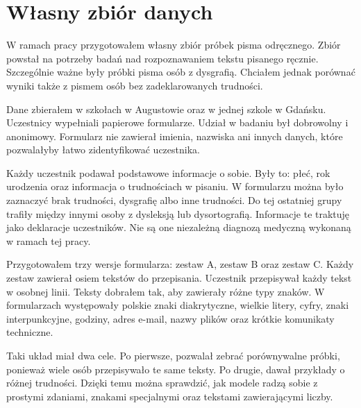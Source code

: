 \section{Własny zbiór danych}

W ramach pracy przygotowałem własny zbiór próbek pisma odręcznego. Zbiór powstał na potrzeby badań nad rozpoznawaniem tekstu pisanego ręcznie. Szczególnie ważne były próbki pisma osób z dysgrafią. Chciałem jednak porównać wyniki także z pismem osób bez zadeklarowanych trudności.

Dane zbierałem w szkołach w Augustowie oraz w jednej szkole w Gdańsku. Uczestnicy wypełniali papierowe formularze. Udział w badaniu był dobrowolny i anonimowy. Formularz nie zawierał imienia, nazwiska ani innych danych, które pozwalałyby łatwo zidentyfikować uczestnika.

Każdy uczestnik podawał podstawowe informacje o sobie. Były to: płeć, rok urodzenia oraz informacja o trudnościach w pisaniu. W formularzu można było zaznaczyć brak trudności, dysgrafię albo inne trudności. Do tej ostatniej grupy trafiły między innymi osoby z dysleksją lub dysortografią. Informacje te traktuję jako deklaracje uczestników. Nie są one niezależną diagnozą medyczną wykonaną w ramach tej pracy.

Przygotowałem trzy wersje formularza: zestaw A, zestaw B oraz zestaw C. Każdy zestaw zawierał osiem tekstów do przepisania. Uczestnik przepisywał każdy tekst w osobnej linii. Teksty dobrałem tak, aby zawierały różne typy znaków. W formularzach występowały polskie znaki diakrytyczne, wielkie litery, cyfry, znaki interpunkcyjne, godziny, adres e-mail, nazwy plików oraz krótkie komunikaty techniczne.

Taki układ miał dwa cele. Po pierwsze, pozwalał zebrać porównywalne próbki, ponieważ wiele osób przepisywało te same teksty. Po drugie, dawał przykłady o różnej trudności. Dzięki temu można sprawdzić, jak modele radzą sobie z prostymi zdaniami, znakami specjalnymi oraz tekstami zawierającymi liczby.

